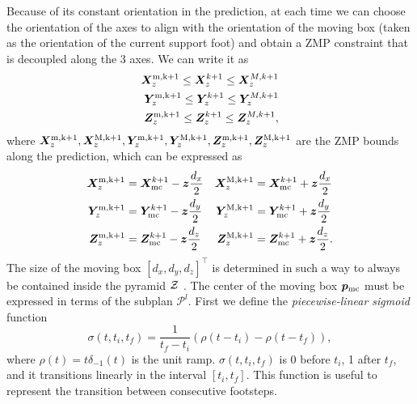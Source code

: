 Because of its constant orientation in the prediction, at each time we can
choose the orientation of the axes to align with the orientation of the moving
box (taken as the orientation of the current support foot) and obtain a ZMP
constraint that is decoupled along the 3 axes. We can write it as
\begin{align}
    \label{eq:ZMP-constraints}
    \begin{split}
        \bm{X}_z^{\rm m,k+1} \le \bm{X}_z^{k+1} \le \bm{X}_z^{M,k+1} \\
        \bm{Y}_z^{\rm m,k+1} \le \bm{Y}_z^{k+1} \le \bm{Y}_z^{M,k+1} \\
        \bm{Z}_z^{\rm m,k+1} \le \bm{Z}_z^{k+1} \le \bm{Z}_z^{M,k+1},
    \end{split}
\end{align}
where $\bm{X}_z^{\rm m,k+1}, \bm{X}_z^{\rm M,k+1}, \bm{Y}_z^{\rm m,k+1},
\bm{Y}_z^{\rm M,k+1}, \bm{Z}_z^{\rm m,k+1}, \bm{Z}_z^{\rm M,k+1}$
are the ZMP bounds along the prediction, which can be expressed as
\begin{equation}
    \begin{aligned}
        \bm{X}_z^{\rm m,k+1} &= \bm{X}_{\rm mc}^{k+1} - {\bm{z}} \frac{d_x}{2} &
        \bm{X}_z^{\rm M,k+1} &= \bm{X}_{\rm mc}^{k+1} + {\bm{z}} \frac{d_x}{2} \\
        \bm{Y}_z^{\rm m,k+1} &= \bm{Y}_{\rm mc}^{k+1} - {\bm{z}} \frac{d_y}{2} &
        \bm{Y}_z^{\rm M,k+1} &= \bm{Y}_{\rm mc}^{k+1} + {\bm{z}} \frac{d_y}{2} \\
        \bm{Z}_z^{\rm m,k+1} &= \bm{Z}_{\rm mc}^{k+1} - {\bm{z}} \frac{d_z}{2} &
        \bm{Z}_z^{\rm M,k+1} &= \bm{Z}_{\rm mc}^{k+1} + {\bm{z}} \frac{d_z}{2}.
    \end{aligned}
\label{eq:FAPA:zmp_constraint_displacement}
\end{equation}
The size of the moving box $[d_x, d_y, d_z]^\top$ is
determined in such a way to always be contained inside the pyramid $\cal Z$
\cite{Zamparelli2018SYROCO, Cipriano2023RAS}.
The center of the moving box ${\bm{p}}_{\rm mc}$ must be expressed in terms of
the subplan $\mathcal{P}^l$. First we define the {\em piecewise-linear sigmoid}
function 
\begin{equation*}
\sigma (t,t_i,t_f)=\frac{1}{t_f-t_i} \left(\rho(t-t_i)-\rho(t-t_f)\right),
\end{equation*}
where $\rho(t)=t\delta_{-1}(t)$ is the unit ramp.
$\sigma (t,t_i,t_f)$ is 0 before $t_i$,  1 after $t_f$, and it transitions
linearly in the interval $[t_i,t_f]$. This function is useful to represent
the transition between consecutive footsteps.

